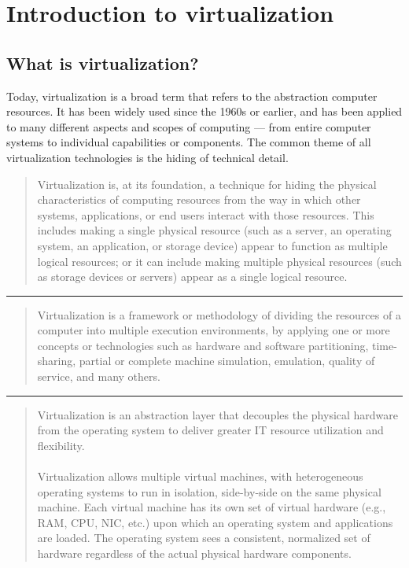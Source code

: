 \chapter{Introduction to virtualization}



\section{What is virtualization?}

Today, virtualization is a broad term that refers to the abstraction computer
resources. It has been widely used since the 1960s or earlier, and has been
applied to many different aspects and scopes of computing — from entire
computer systems to individual capabilities or components. The common theme of
all virtualization technologies is the hiding of technical detail.

\begin{quote}
Virtualization is, at its foundation, a technique for hiding the physical
characteristics of computing resources from the way in which other systems,
applications, or end users interact with those resources. This includes making
a single physical resource (such as a server, an operating system, an
application, or storage device) appear to function as multiple logical
resources; or it can include making multiple physical resources (such as
storage devices or servers) appear as a single logical resource.~\cite{ema101}
\end{quote}

\begin{center}
\rule{10.0em}{0.02em}
\end{center}

\begin{quote}
Virtualization is a framework or methodology of dividing the resources of a
computer into multiple execution environments, by applying one or more concepts
or technologies such as hardware and software partitioning, time-sharing,
partial or complete machine simulation, emulation, quality of service, and many
others.~\cite{singh-intro}
\end{quote}

\begin{center}
\rule{10.0em}{0.02em}
\end{center}

\begin{quote}
Virtualization is an abstraction layer that decouples the physical hardware
from the operating system to deliver greater IT resource utilization and
flexibility.\\
\\
Virtualization allows multiple virtual machines, with heterogeneous operating
systems to run in isolation, side-by-side on the same physical machine. Each
virtual machine has its own set of virtual hardware (e.g., RAM, CPU, NIC, etc.)
upon which an operating system and applications are loaded. The operating
system sees a consistent, normalized set of hardware regardless of the actual
physical hardware components.~\cite{vmware-intro}
\end{quote}

